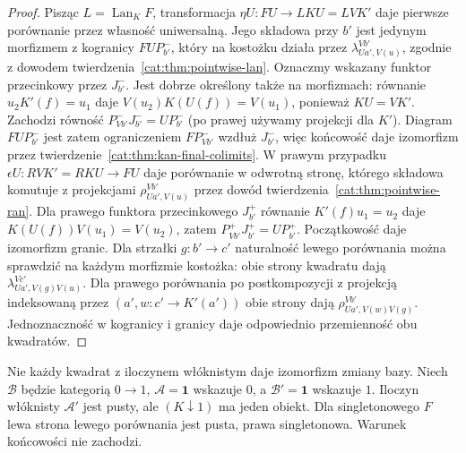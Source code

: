 \begin{proof}
Pisząc $L=\operatorname{Lan}_K F$, transformacja $\eta U:FU\to LKU=LVK'$ daje pierwsze porównanie przez własność uniwersalną. Jego składowa przy $b'$ jest jedynym morfizmem z kogranicy $FU P^-_{b'}$, który na kostożku działa przez $\lambda^{Vb'}_{Ua',V(u)}$, zgodnie z dowodem twierdzenia~\ref{cat:thm:pointwise-lan}. Oznaczmy wskazany funktor przecinkowy przez $J^-_{b'}$. Jest dobrze określony także na morfizmach: równanie $u_2K'(f)=u_1$ daje $V(u_2)K(U(f))=V(u_1)$, ponieważ $KU=VK'$. Zachodzi równość $P^-_{Vb'}J^-_{b'}=UP^-_{b'}$ (po prawej używamy projekcji dla $K'$). Diagram $FU P^-_{b'}$ jest zatem ograniczeniem $FP^-_{Vb'}$ wzdłuż $J^-_{b'}$, więc końcowość daje izomorfizm przez twierdzenie~\ref{cat:thm:kan-final-colimits}. W prawym przypadku $\epsilon U:RVK'=RKU\to FU$ daje porównanie w odwrotną stronę, którego składowa komutuje z projekcjami $\rho^{Vb'}_{Ua',V(u)}$ przez dowód twierdzenia~\ref{cat:thm:pointwise-ran}. Dla prawego funktora przecinkowego $J^+_{b'}$ równanie $K'(f)u_1=u_2$ daje $K(U(f))V(u_1)=V(u_2)$, zatem $P^+_{Vb'}J^+_{b'}=UP^+_{b'}$. Początkowość daje izomorfizm granic. Dla strzałki $g:b'\to c'$ naturalność lewego porównania można sprawdzić na każdym morfizmie kostożka: obie strony kwadratu dają $\lambda^{Vc'}_{Ua',V(g)V(u)}$. Dla prawego porównania po postkompozycji z projekcją indeksowaną przez $(a',w:c'\to K'(a'))$ obie strony dają $\rho^{Vb'}_{Ua',V(w)V(g)}$. Jednoznaczność w kogranicy i granicy daje odpowiednio przemienność obu kwadratów.
\end{proof}
\begin{przyklad}
Nie każdy kwadrat z iloczynem włóknistym daje izomorfizm zmiany bazy. Niech $\mathcal B$ będzie kategorią $0\to1$, $\mathcal A=\mathbf1$ wskazuje $0$, a $\mathcal B'=\mathbf1$ wskazuje $1$. Iloczyn włóknisty $\mathcal A'$ jest pusty, ale $(K\downarrow1)$ ma jeden obiekt. Dla singletonowego $F$ lewa strona lewego porównania jest pusta, prawa singletonowa. Warunek końcowości nie zachodzi.
\end{przyklad}

